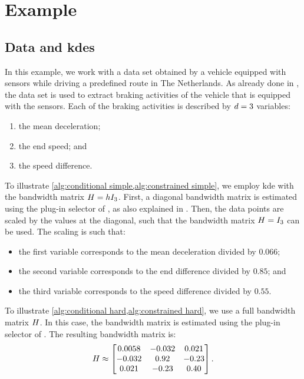 \section{Example}
\label{sec:example}



\subsection{Data and \acp{kde}}
\label{sec:example data}

In this example, we work with a data set obtained by a vehicle equipped with sensors while driving a predefined route in The Netherlands. 
As already done in \autocite{deGelder2017assessment, degelder2019completeness}, the data set is used to extract braking activities of the vehicle that is equipped with the sensors. 
Each of the braking activities is described by $d=3$ variables:
\begin{enumerate}
	\item the mean deceleration;
	\item the end speed; and
	\item the speed difference.
\end{enumerate}

To illustrate \cref{alg:conditional simple,alg:constrained simple}, we employ \ac{kde} with the bandwidth matrix $H=hI_{3}$. 
First, a diagonal bandwidth matrix is estimated using the plug-in selector of \textcite{wand1994multivariate}, as also explained in \autocite{duong2007ks}.
Then, the data points are scaled by the values at the diagonal, such that the bandwidth matrix $H=I_{3}$ can be used. 
The scaling is such that:
\begin{itemize}
	\item the first variable corresponds to the mean deceleration divided by $0.066$;
	\item the second variable corresponds to the end difference divided by $0.85$; and
	\item the third variable corresponds to the speed difference divided by $0.55$.
\end{itemize}

To illustrate \cref{alg:conditional hard,alg:constrained hard}, we use a full bandwidth matrix $H$. 
In this case, the bandwidth matrix is estimated using the plug-in selector of \textcite{wand1994multivariate}. 
The resulting bandwidth matrix is:
\begin{equation}
	H \approx
	\begin{bmatrix}
		0.0058 & -0.032 & 0.021 \\
		-0.032 & 0.92 & -0.23 \\
		0.021 & -0.23 & 0.40
	\end{bmatrix}.
\end{equation}



